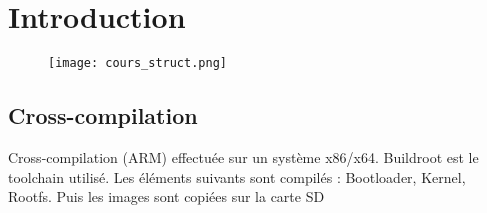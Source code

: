 \section{Introduction}
\begin{figure}[H]
\centering
\texttt{[image: cours\_struct.png]}
\end{figure}
\subsection{Cross-compilation}
Cross-compilation (ARM) effectuée sur un système x86/x64. Buildroot est le toolchain utilisé. Les éléments suivants sont compilés : Bootloader, Kernel, Rootfs. Puis les images sont copiées sur la carte SD